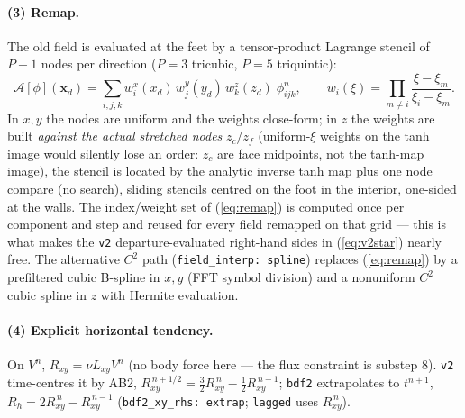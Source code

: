 \documentclass[11pt,a4paper]{article}
\newcommand{\bx}{\mathbf{x}}
\begin{document}
\paragraph{(3) Remap.} The old field is evaluated at the feet by a
tensor-product Lagrange stencil of $P{+}1$ nodes per direction
($P=3$ tricubic, $P=5$ triquintic):
\begin{equation}
\mathcal A[\phi](\bx_d)
= \sum_{i,j,k} w^{x}_{i}(x_d)\, w^{y}_{j}(y_d)\, w^{z}_{k}(z_d)\;
\phi^{n}_{i j k},
\qquad
w_{i}(\xi)=\prod_{m\ne i}\frac{\xi-\xi_m}{\xi_i-\xi_m}.
\label{eq:remap}
\end{equation}
In $x,y$ the nodes are uniform and the weights close-form; in $z$ the weights
are built \emph{against the actual stretched nodes} $z_c$/$z_f$ (uniform-$\xi$
weights on the tanh image would silently lose an order: $z_c$ are face
midpoints, not the tanh-map image), the stencil is located by the analytic
inverse tanh map plus one node compare (no search), sliding stencils centred
on the foot in the interior, one-sided at the walls. The index/weight set of
(\ref{eq:remap}) is computed once per component and step and reused for every
field remapped on that grid --- this is what makes the \texttt{v2}
departure-evaluated right-hand sides in (\ref{eq:v2star}) nearly free. The
alternative $C^{2}$ path (\texttt{field\_interp: spline}) replaces
(\ref{eq:remap}) by a prefiltered cubic B-spline in $x,y$ (FFT symbol
division) and a nonuniform $C^{2}$ cubic spline in $z$ with Hermite
evaluation.

\paragraph{(4) Explicit horizontal tendency.} On $V^{n}$,
$R_{xy}=\nu L_{xy}V^{n}$ (no body force here --- the flux constraint is
substep 8). \texttt{v2} time-centres it by AB2,
$R_{xy}^{\,n+1/2}=\tfrac32 R_{xy}^{\,n}-\tfrac12 R_{xy}^{\,n-1}$; \texttt{bdf2}
extrapolates to $t^{n+1}$, $R_h=2R_{xy}^{\,n}-R_{xy}^{\,n-1}$
(\texttt{bdf2\_xy\_rhs: extrap}; \texttt{lagged} uses $R_{xy}^{\,n}$).
\end{document}
